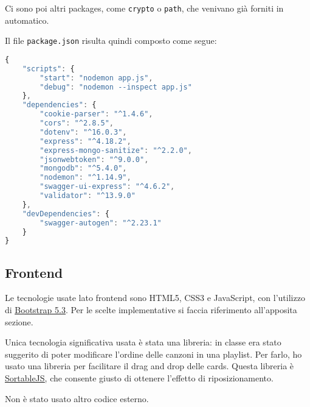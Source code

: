 Ci sono poi altri packages, come \verb|crypto| o \verb|path|, che venivano già forniti in automatico.

Il file \verb|package.json| risulta quindi composto come segue:
\begin{lstlisting}[language=JavaScript]
{
    "scripts": {
        "start": "nodemon app.js",
        "debug": "nodemon --inspect app.js"
    },
    "dependencies": {
        "cookie-parser": "^1.4.6",
        "cors": "^2.8.5",
        "dotenv": "^16.0.3",
        "express": "^4.18.2",
        "express-mongo-sanitize": "^2.2.0",
        "jsonwebtoken": "^9.0.0",
        "mongodb": "^5.4.0",
        "nodemon": "^1.14.9",
        "swagger-ui-express": "^4.6.2",
        "validator": "^13.9.0"
    },
    "devDependencies": {
        "swagger-autogen": "^2.23.1"
    }
}
\end{lstlisting}
\subsection{Frontend}
Le tecnologie usate lato frontend sono HTML5, CSS3 e JavaScript, con l'utilizzo di \href{https://getbootstrap.com/}{\underline{Bootstrap 5.3}}. Per le scelte implementative si faccia riferimento all'apposita sezione.

Unica tecnologia significativa usata è stata una libreria: in classe era stato suggerito di poter modificare l'ordine delle canzoni in una playlist. Per farlo, ho usato una libreria per facilitare il drag and drop delle cards. Questa libreria è \href{https://sortablejs.github.io/Sortable/}{\underline{SortableJS}}, che consente giusto di ottenere l'effetto di riposizionamento.

Non è stato usato altro codice esterno.
\newpage